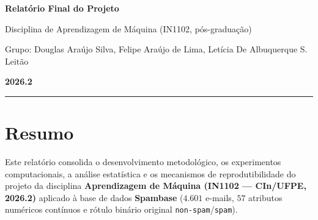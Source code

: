 \documentclass[a4paper,11pt]{article}
\begin{document}
\begin{center}
  {\LARGE\bfseries Relatório Final do Projeto\par}
  \vspace{0.45em}
  {\large Disciplina de Aprendizagem de Máquina (IN1102, pós-graduação)\par}
  \vspace{0.3em}
  {\normalsize Grupo: Douglas Araújo Silva, Felipe Araújo de Lima, Letícia De Albuquerque S. Leitão\par}
  \vspace{0.2em}
  {\normalsize\bfseries 2026.2\par}
\end{center}
\noindent\rule{\linewidth}{0.7pt}\par
\vspace{-1.2em}
\section*{Resumo}
\label{sec:resumo}


Este relatório consolida o desenvolvimento metodológico, os experimentos computacionais, a análise estatística e os mecanismos de reprodutibilidade do projeto da disciplina \textbf{Aprendizagem de Máquina (IN1102 --- CIn/UFPE, 2026.2)} aplicado à base de dados \textbf{Spambase} ($4.601$ e-mails, $57$ atributos numéricos contínuos e rótulo binário original \texttt{non-spam}/\texttt{spam}).
\end{document}
